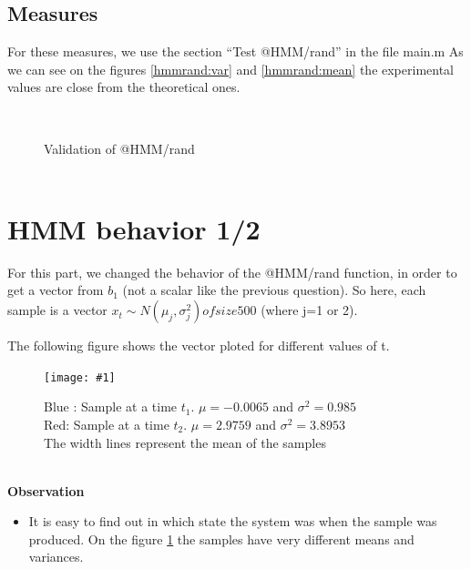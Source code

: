\documentclass[a4paper]{report}
\newcommand{\img}[3]{\begin{figure}[!h] \centering \texttt{[image: \#1]}\captionsetup{justification=centering} \caption{#3} \label{#1} \end{figure}}
\newenvironment{pushright}[1]{\textbf{#1}
\begin{itemize}\item[\hspace{12pt}]}{\end{itemize}
}
\begin{document}
\subsection{Measures}
For these measures, we use the section ``Test @HMM/rand'' in the file main.m
As we can see on the figures \ref{hmmrand:var} and \ref{hmmrand:mean} the experimental values are close from the theoretical ones.
\begin{figure}[!h]
\centering
    \\
\captionsetup{justification=centering}
    \caption{Validation of @HMM/rand\\\color{blue}{Blue : Plot of the 20 attempts}\\\color{red}{Red : Mean over the 20 attempts}}
\end{figure}
\pagebreak
\section{HMM behavior 1/2}
For this part, we changed the behavior of the @HMM/rand function, in order to get a vector from $b_{1}$ (not a scalar like the previous question). So here, each sample is a vector $x_{t} \sim N(\mu_j,\sigma_j^2) of size 500$ (where j=1 or 2).

The following figure shows the vector ploted for different values of t.
\img{etude_hmmrand}{0.4}{{\color{blue}Blue : Sample at a time $t_1$. $\mu=-0.0065$ and $\sigma^2=0.985$}\\ {\color{red}Red: Sample at a time $t_2$. $\mu=2.9759$ and $\sigma^2=3.8953$}\\ The width lines represent the mean of the samples}\\
\begin{pushright}{Observation}
  It is easy to find out in which state the system was when the sample was produced. On the figure \ref{etude_hmmrand} the samples have very different means and variances.
\end{pushright}
\end{document}
